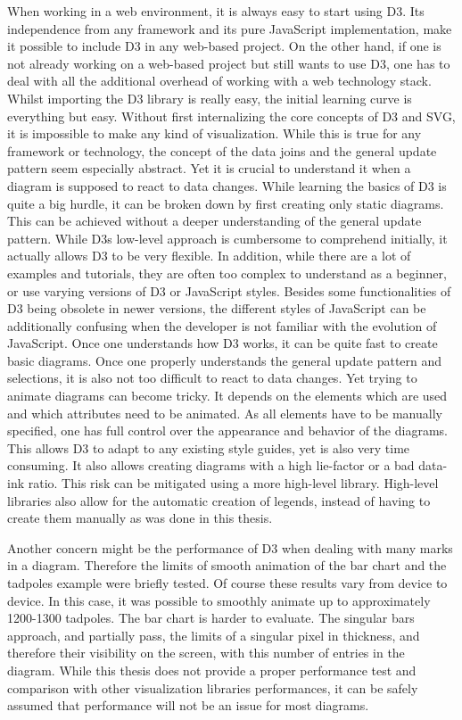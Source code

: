 When working in a web environment, it is always easy to start using D3. Its independence from any framework and its pure JavaScript implementation, make it possible to include D3 in any web-based project. On the other hand, if one is not already working on a web-based project but still wants to use D3, one has to deal with all the additional overhead of working with a web technology stack. Whilst importing the D3 library is really easy, the initial learning curve is everything but easy. Without first internalizing the core concepts of D3 and SVG, it is impossible to make any kind of visualization. While this is true for any framework or technology, the concept of the data joins and the general update pattern seem especially abstract. Yet it is crucial to understand it when a diagram is supposed to react to data changes.
While learning the basics of D3 is quite a big hurdle, it can be broken down by first creating only static diagrams. This can be achieved without a deeper understanding of the general update pattern. While D3s low-level approach is cumbersome to comprehend initially, it actually allows D3 to be very flexible.
In addition, while there are a lot of examples and tutorials, they are often too complex to understand as a beginner, or use varying versions of D3 or JavaScript styles. Besides some functionalities of D3 being obsolete in newer versions, the different styles of JavaScript can be additionally confusing when the developer is not familiar with the evolution of JavaScript.
Once one understands how D3 works, it can be quite fast to create basic diagrams. Once one properly understands the general update pattern and selections, it is also not too difficult to react to data changes. Yet trying to animate diagrams can become tricky. It depends on the elements which are used and which attributes need to be animated. As all elements have to be manually specified, one has full control over the appearance and behavior of the diagrams. This allows D3 to adapt to any existing style guides, yet is also very time consuming. It also allows creating diagrams with a high lie-factor or a bad data-ink ratio. This risk can be mitigated using a more high-level library. High-level libraries also allow for the automatic creation of legends, instead of having to create them manually as was done in this thesis.

Another concern might be the performance of D3 when dealing with many marks in a diagram. Therefore the limits of smooth animation of the bar chart and the tadpoles example\cite{bostock_2020} were briefly tested. Of course these results vary from device to device. In this case, it was possible to smoothly animate up to approximately 1200-1300 tadpoles. The bar chart is harder to evaluate. The singular bars approach, and partially pass, the limits of a singular pixel in thickness, and therefore their visibility on the screen, with this number of entries in the diagram. While this thesis does not provide a proper performance test and comparison with other visualization libraries performances, it can be safely assumed that performance will not be an issue for most diagrams.

